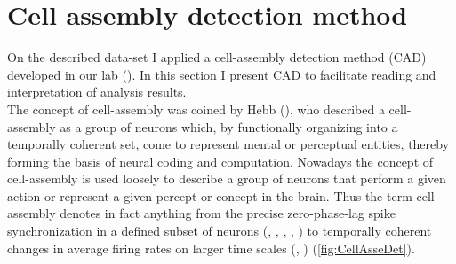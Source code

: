 \section{Cell assembly detection method}
\label{chap:AssemblyMethod}
\begin{framed}
On the described data-set I applied a cell-assembly detection method (CAD) developed in our lab (\cite{RussoDurstewitz}). In this section I present CAD to facilitate reading and interpretation of analysis results.\\The concept of cell-assembly was coined by Hebb (\cite{Hebb}), who described a cell-assembly as a group of neurons which, by functionally organizing into a temporally coherent set, come to represent mental or perceptual entities, thereby forming the basis of neural coding and computation. Nowadays the concept of cell-assembly is used loosely to describe a group of neurons that perform a given action or represent a given percept or concept in the brain. Thus the term cell assembly denotes in fact anything from the precise zero-phase-lag spike synchronization in a defined subset of neurons (\cite{Abeles}, \cite{Singer}, \cite{Roelfsema}, \cite{Diesmann}, \cite{Harris2003}) to temporally coherent changes in average firing rates on larger time scales (\cite{Goldman}, \cite{Durstewitz}) (\ref{fig:CellAsseDet}).
\begin{figure}[H]
    \centering

\end{figure}
\end{framed}
